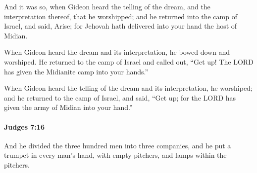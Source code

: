 			\begin{versebox}
					\item[BHS] 
					\item[ASV] And it was so, when Gideon heard the telling of the dream, and the interpretation thereof, that he worshipped; and he returned into the camp of Israel, and said, Arise; for Jehovah hath delivered into your hand the host of Midian.
					\item[NIV] When Gideon heard the dream and its interpretation, he bowed down and worshiped. He returned to the camp of Israel and called out, “Get up! The LORD has given the Midianite camp into your hands.”
					\item[NRSV] When Gideon heard the telling of the dream and its interpretation, he worshiped; and he returned to the camp of Israel, and said, “Get up; for the LORD has given the army of Midian into your hand.”
			\end{versebox}

		\paragraph{Judges 7:16} %
			\label{JUDGES-7-16}

			And he divided the three hundred men into three companies, and he put a trumpet in every man’s hand, with empty pitchers, and lamps within the pitchers.

